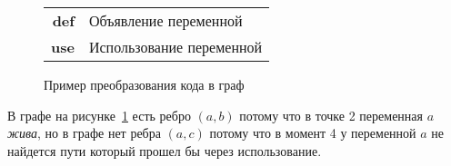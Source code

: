 \begin{example}
    \begin{figure}[h]
        \centering
    \caption{Пример преобразования кода в граф}
    \begin{tabular}{r @{: } l}
        \textbf{def} & Объявление переменной \\
        \textbf{use} & Использование переменной \\
    \end{tabular}
    \label{fig:ex1}
    \end{figure}

        


    В графе на рисунке~\ref{fig:ex1} есть ребро $(a, b)$ потому что в точке 2 переменная $a$ \textit{жива}, но в графе нет ребра $(a, c)$
    потому что в момент 4 у переменной $a$ не найдется пути который прошел бы через использование.
    
\end{example}


